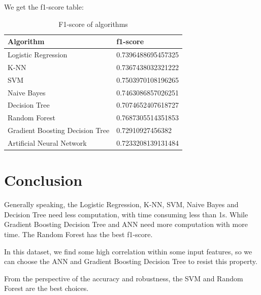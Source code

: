 \documentclass[11pt,en]{elegantpaper}
\begin{document}
We get the f1-score table:


\begin{table}[H]
    \centering
    \begin{tabular}{|l|l|}
    \hline
    Algorithm           & f1-score           \\ \hline
    Logistic Regression & 0.7396488695457325 \\ \hline
    K-NN                & 0.7367438032321222 \\ \hline
    SVM                 & 0.7503970108196265 \\ \hline
    Naive Bayes         & 0.7463086857026251 \\ \hline
    Decision Tree       & 0.7074652407618727 \\ \hline
    Random Forest       & 0.7687305514351853 \\ \hline
    Gradient Boosting Decision Tree      & 0.72910927456382 \\ \hline
    Artificial Neural Network     & 0.7233208139131484 \\ \hline
    \end{tabular}
    \caption{F1-score of algorithms}
\end{table}

\section{Conclusion}
Generally speaking, the Logistic Regression, K-NN, SVM, Naive Bayes and Decision Tree need less computation, with time consuming less than 1s. While Gradient Boosting Decision Tree and ANN need more computation with more time. The Random Forest has the best f1-score.

In this dataset, we find some high correlation within some input features, so we can choose the ANN and Gradient Boosting Decision Tree to resist this property.

From the perspective of the accuracy and robustness, the SVM and Random Forest are the best choices.
%
\end{document}
